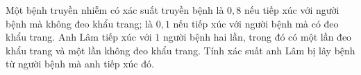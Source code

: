 \begin{bt}%
	Một bệnh truyền nhiễm có xác suất truyền bệnh là $0{,}8$ nếu tiếp xúc với người bệnh mà không đeo khẩu trang; là $0{,}1$ nếu tiếp xúc với người bệnh mà có đeo khẩu trang. Anh Lâm tiếp xúc với $1$ người bệnh hai lần, trong đó có một lần đeo khẩu trang và một lần không đeo khẩu trang. Tính xác suất anh Lâm bị lây bệnh từ người bệnh mà anh tiếp xúc đó.	
\end{bt}